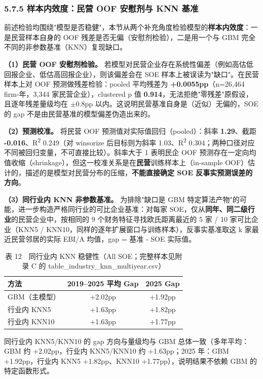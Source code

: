 \documentclass[11pt,a4paper]{ctexart}
\begin{document}
\subsubsection{5.7.5 样本内效度：民营 OOF 安慰剂与 KNN 基准}

前述检验均围绕"模型是否稳健"，本节从两个补充角度检验模型的\textbf{样本内效度}：一是民营样本自身的 OOF 残差是否无偏（安慰剂检验），二是用一个与 GBM 完全不同的非参数基准（KNN）复现缺口。

\textbf{（1）民营 OOF 安慰剂检验。} 若模型对民营企业存在系统性偏差（例如高估低回报企业、低估高回报企业），则该偏差会在 SOE 样本上被误读为"缺口"。在民营样本上对 OOF 预测做残差检验：pooled 平均残差为 \textbf{+0.0055pp}（n=26,464 firm-年，3,344 家民营企业），clustered p 值 \textbf{0.914}，无法拒绝"零残差"原假设，且逐年残差量级均在 $\pm$0.8pp 以内。这说明民营基准自身是（近似）无偏的，SOE 的 gap 不是由民营基准的模型偏差伪造出来的。

\textbf{（2）预测校准。} 将民营 OOF 预测值对实际值回归（pooled）：斜率 \textbf{1.29}、截距 \textbf{-0.016}、R\textsuperscript{2} 0.249（对 winsorize 后目标则为斜率 1.03、R\textsuperscript{2} 0.304；两种口径对应不同被回归变量，不可直接比较）。斜率大于 1 表明民企 OOF 预测存在一定向均值收缩（shrinkage），但这一校准关系是在\textbf{民营}训练样本上（in-sample OOF）估计的，描述的是模型对民营分布的压缩，\textbf{不能直接确定 SOE 反事实预测误差的方向}。

\textbf{（3）同行业内 KNN 非参数基准。} 为排除"缺口是 GBM 特定算法产物"的可能，进一步构造严格同行业的可比企业基准：对每家 SOE，仅从\textbf{同年、同二级行业}的民营企业中，按相同的 9 个财务特征寻找欧氏距离最近的 5 家 / 10 家可比企业（KNN5 / KNN10，同样的逐年扩展窗口与训练样本），反事实基准取这 k 家最近民营邻居的实际 EBI/A 均值，gap = 基准 - SOE 实际值。

\begin{table}[H]
\centering
\small
\caption{表 12　同行业内 KNN 稳健性（All SOE；完整样本见附录 C 的 table\_industry\_knn\_multiyear.csv）}
\begin{tabular}{lcc}
\toprule
方法 & 2019--2025 平均 Gap & 2025 Gap \\
\midrule
GBM（主模型） & +2.02pp & +1.92pp \\
行业内 KNN5 & +1.63pp & +1.82pp \\
行业内 KNN10 & +1.63pp & +1.77pp \\
\bottomrule
\end{tabular}
\end{table}

同行业内 KNN5/KNN10 的 gap 方向与量级均与 GBM 总体一致（多年平均：GBM 约 +2.02pp，行业内 KNN5/KNN10 约 +1.63pp；2025 年：GBM +1.92pp，行业内 KNN5 +1.82pp、KNN10 +1.77pp），说明结果不依赖 GBM 的特定函数形式。
\end{document}
